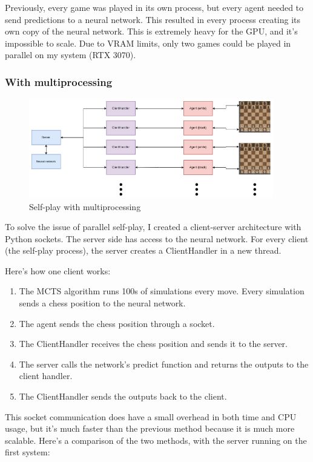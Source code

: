 \documentclass{article}
\begin{document}
Previously, every game was played in its own process, but every agent needed to send predictions to a neural network.
This resulted in every process creating its own copy of the neural network. This is extremely heavy for the GPU, and
it's impossible to scale. Due to VRAM limits, only two games could be played in parallel on my system (RTX 3070).

\subsubsection{With multiprocessing}

\begin{figure}[H]
    \centering
    \includegraphics[width=0.95\textwidth]{img/with-multiprocessing.png}
    \caption{Self-play with multiprocessing}
\end{figure}

To solve the issue of parallel self-play, I created a client-server architecture with Python sockets.
The server side has access to the neural network. For every client (the self-play process), 
the server creates a ClientHandler in a new thread.

Here's how one client works:

\begin{enumerate}
    \item The MCTS algorithm runs 100s of simulations every move. Every simulation sends a chess position to the neural network.
    \item The agent sends the chess position through a socket.
    \item The ClientHandler receives the chess position and sends it to the server.
    \item The server calls the network's predict function and returns the outputs to the client handler.
    \item The ClientHandler sends the outputs back to the client.
\end{enumerate}

This socket communication does have a small overhead in both time and CPU usage, but it's much faster than the previous method
because it is much more scalable. Here's a comparison of the two methods, with the server running on the first system:
\end{document}
